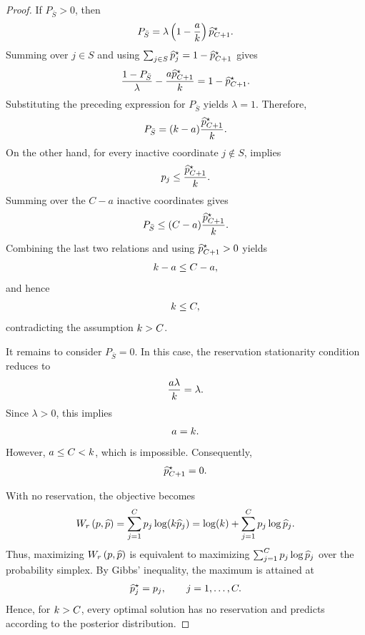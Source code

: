 \begin{proof}
    If \(P_{\bar S}>0\), then
    \begin{align*}
        P_{\bar S}=\lambda\left(1-\frac{a}{k}\right)\widehat{p}_{C+1}^\star.
    \end{align*}
    Summing  over \(j\in S\) and using \(\sum_{j\in S}\widehat{p}_j^\star=1-\widehat{p}_{C+1}^\star\) gives
    \begin{align*} \frac{1-P_{\bar S}}{\lambda}-\frac{a\widehat{p}_{C+1}^\star}{k}=1-\widehat{p}_{C+1}^\star. \end{align*}
    Substituting the preceding expression for \(P_{\bar S}\) yields
    \(\lambda=1 \).
    Therefore,
    \begin{align*}
        P_{\bar S}=(k-a)\frac{\widehat{p}_{C+1}^\star}{k}.
    \end{align*}
    On the other hand, for every inactive coordinate \(j\notin S\),  implies
    \begin{align*}
        p_j\le\frac{\widehat{p}_{C+1}^\star}{k}.
    \end{align*}
    Summing over the \(C-a\) inactive coordinates gives
    \begin{align*}
        P_{\bar S}\le(C-a)\frac{\widehat{p}_{C+1}^\star}{k}.
    \end{align*}
    Combining the last two relations and using \(\widehat{p}_{C+1}^\star>0\) yields
    \begin{align*}
        k-a\le C-a,
    \end{align*}
    and hence
    \begin{align*}
        k\le C,
    \end{align*}
    contradicting the assumption \(k>C\).

    It remains to consider \(P_{\bar S}=0\). In this case, the reservation stationarity condition reduces to
    \begin{align*} \frac{a\lambda}{k}=\lambda. \end{align*}
    Since \(\lambda>0\), this implies
    \begin{align*} a=k. \end{align*}
    However, \(a\le C<k\), which is impossible. Consequently,
    \begin{align*} \widehat{p}_{C+1}^\star=0. \end{align*}

    With no reservation, the objective becomes
    \begin{align*}
        \W{r}=\sum_{j=1}^{C}p_j\log(\costmult\phat_j)=\log(\costmult)+\sum_{j=1}^{C}p_j\log\phat_j.
    \end{align*}
    Thus, maximizing \(\W{r}\) is equivalent to maximizing \(\sum_{j=1}^{C}p_j\log\widehat{p}_j\) over the probability simplex. By Gibbs' inequality, the maximum is attained at
    \begin{align*}
        \widehat{p}_j^\star=p_j, \qquad j=1,\ldots,C.
    \end{align*}
    Hence, for \(k>C\), every optimal solution has no reservation and predicts according to the posterior distribution.


\end{proof}
